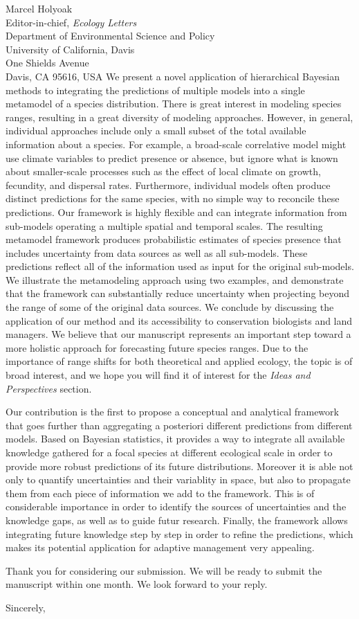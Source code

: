 \documentclass[11pt]{letter}
\makeatletter
\renewcommand{\closing}[1]{\par\nobreak\vspace{\parskip}%
  \stopbreaks
  \noindent
  \ifx\@empty\fromaddress\else
  \hspace*{\longindentation}\fi
  \parbox{\indentedwidth}{\raggedright
       \ignorespaces #1\\[1\medskipamount]%
       \ifx\@empty\fromsig
           \fromname
       \else \fromsig \fi\strut}%
   \par}
\makeatother
\begin{document}
\begin{letter}{Marcel Holyoak \\ 
	Editor-in-chief, \emph{Ecology Letters} \\ 
	Department of Environmental Science and Policy \\
	University of California, Davis \\
	One Shields Avenue \\
	Davis, CA 95616, USA }
We present a novel application of hierarchical Bayesian methods to integrating the predictions of multiple models into a single metamodel of a species distribution.
There is great interest in modeling species ranges, resulting in a great diversity of modeling approaches.
However, in general, individual approaches include only a small subset of the total available information about a species. 
For example, a broad-scale correlative model might use climate variables to predict presence or absence, but ignore what is known about smaller-scale processes such as the effect of local climate on growth, fecundity, and dispersal rates.
Furthermore, individual models often produce distinct predictions for the same species, with no simple way to reconcile these predictions.
Our framework is highly flexible and can integrate information from sub-models operating a multiple spatial and temporal scales.
The resulting metamodel framework produces probabilistic estimates of species presence that includes uncertainty from data sources as well as all sub-models.
 These predictions reflect all of the information used as input for the original sub-models.
We illustrate the metamodeling approach using two examples, and demonstrate that the framework can substantially reduce uncertainty when projecting beyond the range of some of the original data sources.
We conclude by discussing the application of our method and its accessibility to conservation biologists and land managers.
We believe that our manuscript represents an important step toward a more holistic approach for forecasting future species ranges.
Due to the importance of range shifts for both theoretical and applied ecology, the topic is of broad interest, and we hope you will find it of interest for the \emph{Ideas and Perspectives} section.

Our contribution is the first to propose a conceptual and analytical framework that goes further than aggregating a posteriori different predictions from different models. 
Based on Bayesian statistics, it provides a way to integrate all available knowledge gathered for a focal species at different ecological scale in order to provide more robust predictions of its future distributions.
Moreover it is able not only to quantify uncertainties and their variablity in space, but also to propagate them from each piece of information we add to the framework.
This is of considerable importance in order to identify the sources of uncertainties and the knowledge gaps, as well as to guide futur research.
Finally, the framework allows integrating future knowledge step by step in order to refine the predictions, which makes its potential application for adaptive management very appealing.

Thank you for considering our submission. We will be ready to submit the manuscript within one month. We look forward to your reply.

\closing{Sincerely,}

\end{letter}
\end{document}
